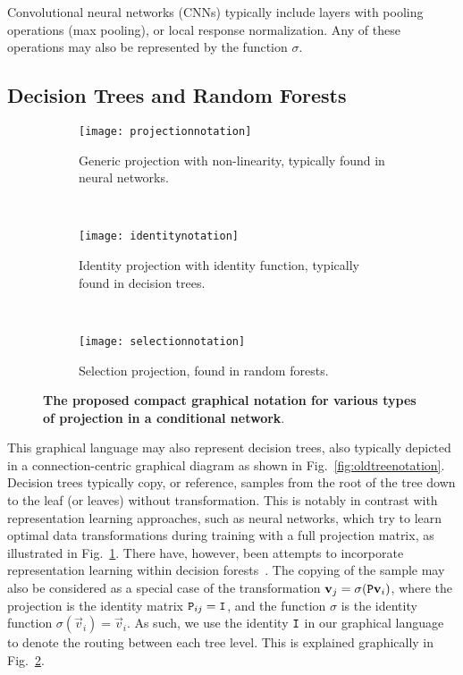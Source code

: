 \documentclass[thesis]{subfiles}
\begin{document}
Convolutional neural networks (CNNs) typically include layers with pooling operations (\eg max pooling), or local response normalization. Any of these operations may also be represented by the function $\sigma$.

\subsection{Decision Trees and Random Forests}

\begin{figure}[htbp!] 
\centering
\begin{subfigure}[b]{\textwidth}
   \centering
   \texttt{[image: projectionnotation]}
   \caption{Generic projection with non-linearity, typically found in neural networks.}
   \label{fig:projectionnotation}
\end{subfigure}
~
\begin{subfigure}[b]{\textwidth}
   \centering
   \texttt{[image: identitynotation]}
   \caption{Identity projection with identity function, typically found in decision trees.}
   \label{fig:identitynotation}
\end{subfigure}
~
\begin{subfigure}[b]{\textwidth}
   \centering
   \texttt{[image: selectionnotation]}
   \caption{Selection projection, found in random forests.}
   \label{fig:selectionnotation}
\end{subfigure}
\caption[Various projection matrices in conditional networks.]{{\bf The proposed compact graphical notation for various types of projection in a conditional network}.}
\label{fig:projections}
\end{figure}

This graphical language may also represent decision trees, also typically depicted in a connection-centric graphical diagram as shown in Fig.~\ref{fig:oldtreenotation}. Decision trees typically copy, or reference, samples from the root of the tree down to the leaf (or leaves) without transformation. This is notably in contrast with representation learning approaches, such as neural networks, which try to learn optimal data transformations during training with a full projection matrix, as illustrated in Fig.~\ref{fig:projectionnotation}. There have, however, been attempts to incorporate representation learning within decision forests~\cite{montillo2011entangled,BuloKontsch2014}. The copying of the sample may also be considered as a special case of the transformation $\vec v_j = \sigma(\mat P \vec v_i)$, where the projection is the identity matrix $\mat P_{ij} = \mat I$, and the function $\sigma$ is the identity function $\sigma(\vec v_i) = \vec v_i$. As such, we use the identity $\mat I$ in our graphical language to denote the routing between each tree level. This is explained graphically in Fig.~\ref{fig:identitynotation}.
\end{document}
